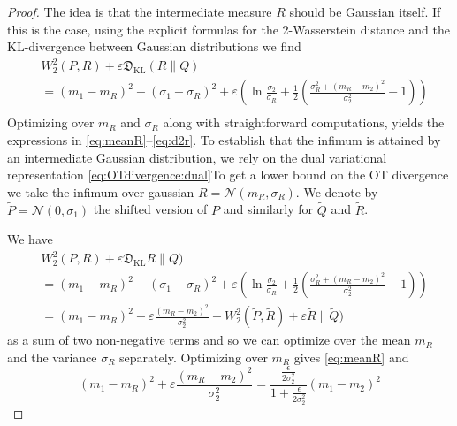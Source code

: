 \documentclass{amsart}
\theoremstyle{definition}
\theoremstyle{remark}
\numberwithin{equation}{section}
\begin{document}
\begin{proof}
The idea is that 
the intermediate measure $R$ should be Gaussian
itself.  If this is the case, using the explicit formulas for the 2-Wasserstein distance and the KL-divergence between Gaussian distributions we find 
\begin{equation}
\begin{aligned}
& W_2^2(P,R) + \varepsilon \mathfrak{D}_{\mathrm{KL}}(R\|Q) \\
&= (m_1 - m_R)^2 + (\sigma_1 - \sigma_R)^2 + 
\varepsilon \left(
\ln\frac{\sigma_2}{\sigma_R} + \frac{1}{2}\left( \frac{\sigma_R^2 +(m_R - m_2)^2}{\sigma_2^2} - 1
\right) \right)\\
\end{aligned}
\end{equation}
Optimizing over $m_R$ and $\sigma_R$ along with straightforward computations, yields the expressions in \eqref{eq:meanR}--\eqref{eq:d2r}. To establish that the infimum is attained by an intermediate Gaussian distribution, we rely on the dual variational representation \eqref{eq:OTdivergence:dual}To get a lower bound on the OT divergence we take the infimum over gaussian  $R=\mathcal{N}(m_R,\sigma_R)$.  We denote by $\tilde{P} = \mathcal{N}(0,\sigma_1)$
the shifted version of $P$
and similarly  for $\tilde{Q}$ and $\tilde{R}$.  


We have 
\begin{equation}
\begin{aligned}
& W_2^2(P,R) + \varepsilon \mathfrak{D}_{\mathrm{KL}}R\|Q) \\
&= (m_1 - m_R)^2 + (\sigma_1 - \sigma_R)^2 + 
\varepsilon \left(
\ln\frac{\sigma_2}{\sigma_R} + \frac{1}{2}\left( \frac{\sigma_R^2 +(m_R - m_2)^2}{\sigma_2^2} - 1
\right) \right)\\
& = (m_1 - m_R)^2 + \varepsilon \frac{(m_R - m_2)^2}{\sigma_2^2}
+ W_2^2(\tilde{P},\tilde{R}) +\varepsilon \mathfrak{}\tilde{R}\|\tilde{Q})
\end{aligned}
\end{equation}
as a sum of two non-negative terms and so we can optimize over the mean $m_R$ and the variance $\sigma_R$ separately. Optimizing over $m_R$ gives \eqref{eq:meanR}
and 
\[
(m_1 - m_R)^2 + \varepsilon \frac{(m_R - m_2)^2}{\sigma_2^2}= \frac{\frac{\epsilon}{2 \sigma_2^2}}{1+\frac{\epsilon}{2 \sigma_2^2}}(m_1-m_2)^2
\]


\end{proof}
\end{document}
